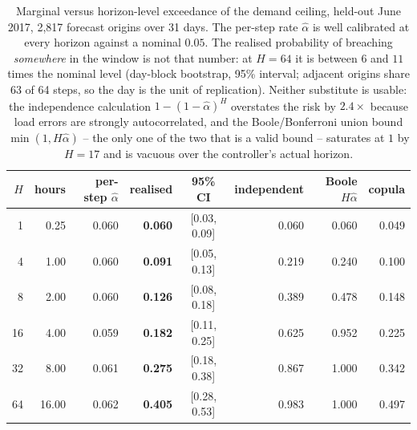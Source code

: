 \begin{table}[t]
\centering
\footnotesize
\setlength{\tabcolsep}{3.5pt}
\begin{tabular}{rrrrcrrr}
\toprule
$H$ & hours & per-step $\hat\alpha$ & realised & 95\% CI & independent & Boole $H\hat\alpha$ & copula \\
\midrule
1 & 0.25 & 0.060 & \textbf{0.060} & [0.03, 0.09] & 0.060 & 0.060 & 0.049 \\
4 & 1.00 & 0.060 & \textbf{0.091} & [0.05, 0.13] & 0.219 & 0.240 & 0.100 \\
8 & 2.00 & 0.060 & \textbf{0.126} & [0.08, 0.18] & 0.389 & 0.478 & 0.148 \\
16 & 4.00 & 0.059 & \textbf{0.182} & [0.11, 0.25] & 0.625 & 0.952 & 0.225 \\
32 & 8.00 & 0.061 & \textbf{0.275} & [0.18, 0.38] & 0.867 & 1.000 & 0.342 \\
64 & 16.00 & 0.062 & \textbf{0.405} & [0.28, 0.53] & 0.983 & 1.000 & 0.497 \\
\bottomrule
\end{tabular}
\caption{Marginal versus horizon-level exceedance of the demand ceiling, held-out June 2017, 2,817 forecast origins over 31 days. The per-step rate $\hat\alpha$ is well calibrated at every horizon against a nominal $0.05$. The realised probability of breaching \emph{somewhere} in the window is not that number: at $H=64$ it is between $6$ and $11$ times the nominal level (day-block bootstrap, 95\% interval; adjacent origins share 63 of 64 steps, so the day is the unit of replication). Neither substitute is usable: the independence calculation $1-(1-\hat\alpha)^H$ overstates the risk by $2.4\times$ because load errors are strongly autocorrelated, and the Boole/Bonferroni union bound $\min(1, H\hat\alpha)$ -- the only one of the two that is a valid bound -- saturates at $1$ by $H=17$ and is vacuous over the controller's actual horizon.}
\label{tab:horizon}
\end{table}
